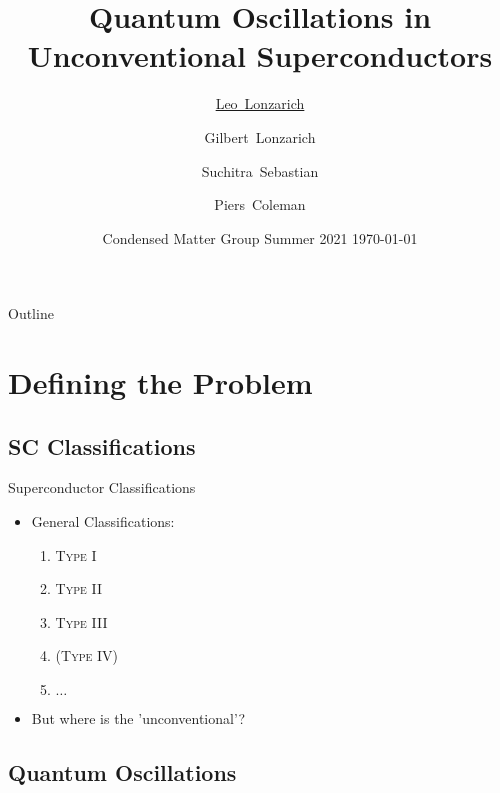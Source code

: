 \documentclass{beamer}
\title[Quantum Oscillations] 
{%
 Quantum Oscillations in\\ Unconventional Superconductors%
}
\author[Lonzarich]
{
  \underline{Leo~Lonzarich} \and Gilbert~Lonzarich\inst{1} \and Suchitra~Sebastian\inst{1} \and Piers~Coleman\inst{2}
  }
\institute[Cambridge]
{
\inst{1}%
Cavendish Laboratory, University of Cambridge, UK\\
\inst{2}%
Materials Theory Group, Rutgers University, USA
}
\date[CMS2021]
{Condensed Matter Group Summer 2021 \hfill \today}
\begin{document}
\begin{frame}
  \titlepage
\end{frame}

\begin{frame}{Outline}
  \tableofcontents
\end{frame}




\section{Defining the Problem}
\subsection{SC Classifications}

\begin{frame}
{Superconductor Classifications}
 
\begin{itemize}
    \item General Classifications:
        \begin{enumerate}
            \item \textsc{Type I}
            \item \textsc{Type II}
            \item \textsc{Type III}
            \item \textsc{(Type IV)}
            \item $\ldots$
        \end{enumerate}
        
    \item But where is the 'unconventional'?
\end{itemize}
 
\citet{baskaran2015}
\end{frame}



\subsection{Quantum Oscillations}
\end{document}
